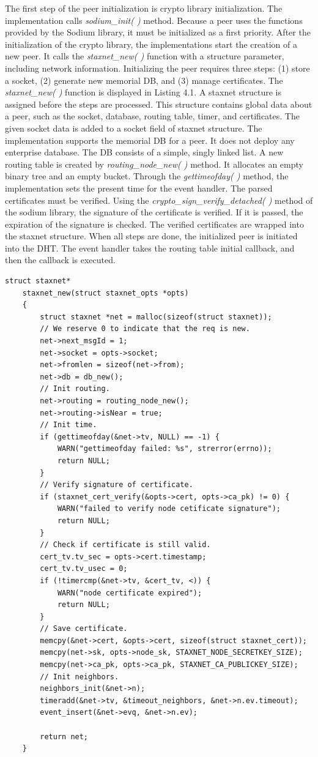 The first step of the peer initialization is crypto library initialization. The implementation calls \textit{sodium\_init( )} method. Because a peer uses the functions provided by the Sodium library, it must be initialized as a first priority. After the initialization of the crypto library, the implementations start the creation of a new peer. It calls the \textit{staxnet\_new( )} function with a structure parameter, including network information. Initializing the peer requires three steps: (1) store a socket, (2) generate new memorial DB, and (3) manage certificates. The \textit{staxnet\_new( )} function is displayed in Listing 4.1. A staxnet structure is assigned before the steps are processed. This structure contains global data about a peer, such as the socket, database, routing table, timer, and certificates. The given socket data is added to a socket field of staxnet structure. The implementation supports the memorial DB for a peer. It does not deploy any enterprise database. The DB consists of a simple, singly linked list. A new routing table is created by \textit{routing\_node\_new( )} method. It allocates an empty binary tree and an empty bucket. Through the \textit{gettimeofday( )} method, the implementation sets the present time for the event handler. The parsed certificates must be verified. Using the \textit{crypto\_sign\_verify\_detached( )} method of the sodium library, the signature of the certificate is verified. If it is passed, the expiration of the signature is checked. The verified certificates are wrapped into the staxnet structure. When all steps are done, the initialized peer is initiated into the DHT. The event handler takes the routing table initial callback, and then the callback is executed.

\lstset{language=C} 
\begin{lstlisting}[caption=Peer initialization]
	struct staxnet*
	staxnet_new(struct staxnet_opts *opts)
	{
		struct staxnet *net = malloc(sizeof(struct staxnet));
		// We reserve 0 to indicate that the req is new.
		net->next_msgId = 1;
		net->socket = opts->socket;
		net->fromlen = sizeof(net->from);
		net->db = db_new();
		// Init routing.
		net->routing = routing_node_new();
		net->routing->isNear = true;
		// Init time.
		if (gettimeofday(&net->tv, NULL) == -1) {
			WARN("gettimeofday failed: %s", strerror(errno));
			return NULL;
		}
		// Verify signature of certificate.
		if (staxnet_cert_verify(&opts->cert, opts->ca_pk) != 0) {
			WARN("failed to verify node cetificate signature");
			return NULL;
		}
		// Check if certificate is still valid.
		cert_tv.tv_sec = opts->cert.timestamp;
		cert_tv.tv_usec = 0;
		if (!timercmp(&net->tv, &cert_tv, <)) {
			WARN("node certificate expired");
			return NULL;
		}
		// Save certificate.
		memcpy(&net->cert, &opts->cert, sizeof(struct staxnet_cert));
		memcpy(net->sk, opts->node_sk, STAXNET_NODE_SECRETKEY_SIZE);
		memcpy(net->ca_pk, opts->ca_pk, STAXNET_CA_PUBLICKEY_SIZE);
		// Init neighbors.
		neighbors_init(&net->n);
		timeradd(&net->tv, &timeout_neighbors, &net->n.ev.timeout);
		event_insert(&net->evq, &net->n.ev);
		
		return net;
	}
	
\end{lstlisting}

